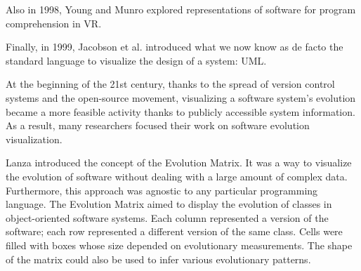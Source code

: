 \bigbreak
Also in 1998, Young and Munro \cite{Young1998} explored representations of software for program comprehension in VR. 

\bigbreak
Finally, in 1999, Jacobson et al. \cite{Jacobson1999} introduced what we now know as de facto the standard language to visualize the design of a system: UML. 



\bigbreak
At the beginning of the 21st century, thanks to the spread of version control systems and the open-source movement, 
visualizing a software system's evolution became a more feasible activity thanks to publicly accessible system information.
As a result, many researchers focused their work on software evolution visualization.

\bigbreak
Lanza \cite{Lanza2001} introduced the concept of the Evolution Matrix. 
It was a way to visualize the evolution of software without dealing with a large amount of complex data. 
Furthermore, this approach was agnostic to any particular programming language. 
The Evolution Matrix aimed to display the evolution of classes in object-oriented software systems. 
Each column represented a version of the software; each row represented a different version of the same class.
Cells were filled with boxes whose size depended on evolutionary measurements. 
The shape of the matrix could also be used to infer various evolutionary patterns.

